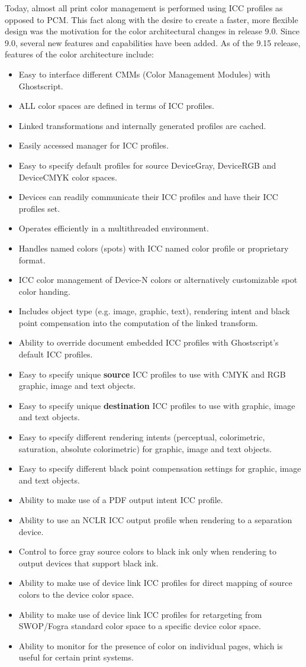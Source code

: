 \documentclass[12pt,notitlepage]{article}
\begin{document}
Today, almost all print color management is performed using ICC profiles as opposed to PCM.  This fact along with the desire to create a faster, more flexible design was the motivation for the color architectural changes in release 9.0.  Since 9.0, several new features and capabilities  have been added. As of the 9.15 release, features of the color architecture include:
\begin{itemize}
\item Easy to interface different CMMs (Color Management Modules) with Ghostscript.
\item ALL color spaces are defined in terms of ICC profiles.
\item Linked transformations and internally generated profiles are cached.
\item Easily accessed manager for ICC profiles.
\item Easy to specify default profiles for source DeviceGray, DeviceRGB and DeviceCMYK color spaces.
\item Devices can readily communicate their ICC profiles and have their ICC profiles set.
\item Operates efficiently in a multithreaded environment.
\item Handles named colors (spots) with ICC named color profile or proprietary format.
\item ICC color management of Device-N colors or alternatively customizable spot color handing.
\item Includes object type (e.g. image, graphic, text), rendering intent and black point compensation into the computation of the linked transform.
\item Ability to override document embedded ICC profiles with Ghostscript's default ICC profiles.
\item Easy to specify unique {\bf source} ICC profiles to use with CMYK and RGB graphic, image and text objects.
\item Easy to specify unique {\bf destination} ICC profiles to use with graphic, image and text objects.
\item Easy to specify different rendering intents (perceptual, colorimetric, saturation, absolute colorimetric) for graphic, image and text objects.
\item Easy to specify different black point compensation settings for graphic, image and text objects.
\item Ability to make use of a PDF output intent ICC profile.
\item Ability to use an NCLR ICC output profile when rendering to a separation device.
\item Control to force gray source colors to black ink only when rendering to output devices that support black ink.
\item Ability to make use of device link ICC profiles for direct mapping of source colors to the device color space.
\item Ability to make use of device link ICC profiles for retargeting from SWOP/Fogra standard color space to a specific device color space.
\item Ability to monitor for the presence of color on individual pages, which is useful for certain print systems.
\end{itemize}
\end{document}

